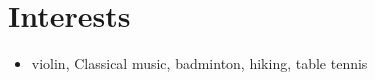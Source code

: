 \documentclass[letterpaper]{article}
\begin{document}
\section*{Interests}
\begin{itemize}
\item violin, Classical music, badminton, hiking, table tennis
\end{itemize}

\bigskip
\begin{center}
\begin{footnotesize}
\end{footnotesize}
\end{center}
\end{document}
